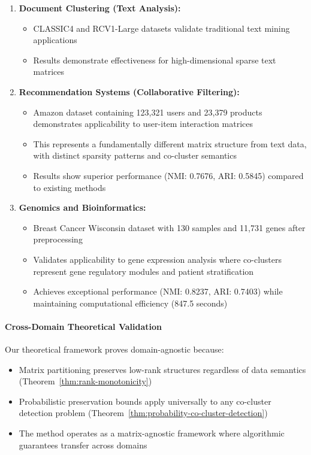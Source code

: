 \documentclass{ar2rc}
\begin{document}
\begin{enumerate}
  \item \textbf{Document Clustering (Text Analysis):}
        \begin{itemize}
          \item CLASSIC4 and RCV1-Large datasets validate traditional text mining applications
          \item Results demonstrate effectiveness for high-dimensional sparse text matrices
        \end{itemize}

  \item \textbf{Recommendation Systems (Collaborative Filtering):}
        \begin{itemize}
          \item Amazon dataset containing 123,321 users and 23,379 products demonstrates applicability to user-item interaction matrices
          \item This represents a fundamentally different matrix structure from text data, with distinct sparsity patterns and co-cluster semantics
          \item Results show superior performance (NMI: 0.7676, ARI: 0.5845) compared to existing methods
        \end{itemize}

  \item \textbf{Genomics and Bioinformatics:}
        \begin{itemize}
          \item Breast Cancer Wisconsin dataset with 130 samples and 11,731 genes after preprocessing
          \item Validates applicability to gene expression analysis where co-clusters represent gene regulatory modules and patient stratification
          \item Achieves exceptional performance (NMI: 0.8237, ARI: 0.7403) while maintaining computational efficiency (847.5 seconds)
        \end{itemize}
\end{enumerate}

\paragraph{Cross-Domain Theoretical Validation}

Our theoretical framework proves domain-agnostic because:
\begin{itemize}
  \item Matrix partitioning preserves low-rank structures regardless of data semantics (Theorem~\ref{thm:rank-monotonicity})
  \item Probabilistic preservation bounds apply universally to any co-cluster detection problem (Theorem~\ref{thm:probability-co-cluster-detection})
  \item The method operates as a matrix-agnostic framework where algorithmic guarantees transfer across domains
\end{itemize}
\end{document}
